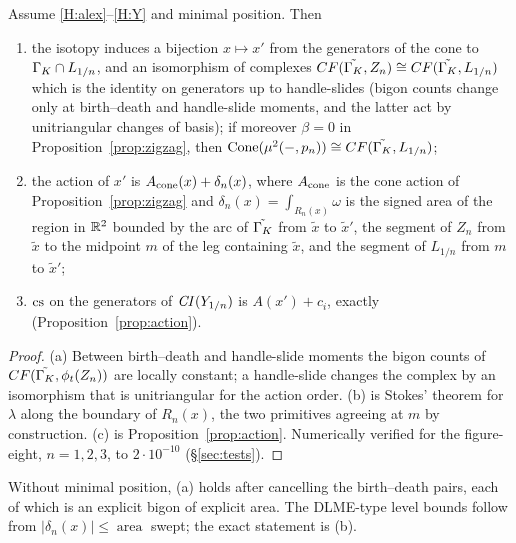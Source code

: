 \begin{theorem}\label{thm:exact}
Assume \ref{H:alex}--\ref{H:Y} and minimal position.  Then
\begin{enumerate}[label=(\alph*)]
\item the isotopy induces a bijection $x\mapsto x'$ from the generators of the cone to $\Gamma_K\cap L_{1/n}$, and
an isomorphism of complexes $CF(\tilde{\Gamma_K},Z_n)\cong CF(\tilde{\Gamma_K},L_{1/n})$ which is the identity on generators
up to handle-slides (bigon counts change only at birth--death and handle-slide moments, and the latter act by
unitriangular changes of basis); if moreover $\beta=0$ in Proposition~\ref{prop:zigzag}, then
$\operatorname{Cone}(\mu^2(-,p_n))\cong CF(\tilde{\Gamma_K},L_{1/n})$;
\item the action of $x'$ is $A_{\rm cone}(x)+\delta_n(x)$, where $A_{\rm cone}$ is the cone action of
Proposition~\ref{prop:zigzag} and $\delta_n(x)=\int_{R_n(x)}\omega$ is the signed area of the region in $\mathbb{R}^2$
bounded by the arc of $\tilde{\Gamma_K}$ from $\tilde x$ to $\tilde x'$, the segment of $Z_n$ from $\tilde x$ to the
midpoint $m$ of the leg containing $\tilde x$, and the segment of $L_{1/n}$ from $m$ to $\tilde x'$;
\item $\mathrm{cs}$ on the generators of $\mathit{CI}(Y_{1/n})$ is $A(x')+c_i$, exactly (Proposition~\ref{prop:action}).
\end{enumerate}
\end{theorem}
\begin{proof}
(a) Between birth--death and handle-slide moments the bigon counts of $CF(\tilde{\Gamma_K},\phi_t(Z_n))$ are locally
constant; a handle-slide changes the complex by an isomorphism that is unitriangular for the action order.
(b) is Stokes' theorem for $\lambda$ along the boundary of $R_n(x)$, the two primitives agreeing at $m$ by
construction.  (c) is Proposition~\ref{prop:action}.  Numerically verified for the figure-eight, $n=1,2,3$, to
$2\cdot10^{-10}$ (\S\ref{sec:tests}).
\end{proof}
Without minimal position, (a) holds after cancelling the birth--death pairs, each of which is an explicit bigon
of explicit area.  The DLME-type level bounds follow from $|\delta_n(x)|\le\operatorname{area}$ swept; the exact
statement is (b).


